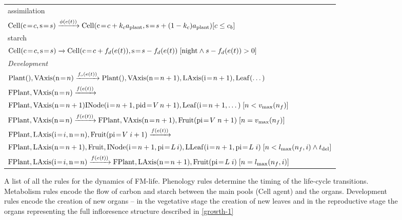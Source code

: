 \begin{figure}[p]
{\begin{tabularx}{1.3\textwidth}{l}
\textsf{assimilation} \\
\addlinespace[-0.1cm]
$\mathrm{Cell}(\ar{c}{c}, \ar{s}{s}) \xrightarrow{\phi(e(t))}
\mathrm{Cell}(\ar{c}{c+k_c a_{\mathrm{plant}}}, \ar{s}{s+(1-k_c) a_{\mathrm{plant}}})
[c \leq c_b]$ \\

\textsf{starch} \\
\addlinespace[-0.1cm]
$\mathrm{Cell}(\ar{c}{c}, \ar{s}{s}) \xrightarrow{}
\mathrm{Cell}(\ar{c}{c+f_d(e(t)}), \ar{s}{s-f_d(e(t)}) \;
[\mathrm{night} \land s-f_d(e(t)) > 0]$ \\ 

\textsf{\emph{Development}} \\
\addlinespace[-0.1cm]
$\mathrm{Plant}(), \mathrm{VAxis}(\mathrm{n} \! = \! {n}) \xrightarrow{f_o(e(t))}
\mathrm{Plant}(), \mathrm{VAxis}(\mathrm{n} \! = \! {n+1}), \mathrm{LAxis}(\mathrm{i} \! = \! {n+1}),
\mathrm{Leaf}(\dots)$ \\

$\mathrm{FPlant}, \mathrm{VAxis}(\mathrm{n} \! = \! {n}) \xrightarrow{f(e(t))}$ \\
\addlinespace[-0.27cm]
$\mathrm{FPlant}, \mathrm{VAxis}(\ar{n}{n+1})
\mathrm{INode}(\ar{i}{n+1}, \ar{pid}{V \, n+1}),
\mathrm{Leaf}(\ar{i}{n+1}, \dots)
\; [n < v_{\mathrm{max}}(n_f)]$ \\

$\mathrm{FPlant}, \mathrm{VAxis}(\mathrm{n} \! = \! {n}) \xrightarrow{f(e(t))}
\mathrm{FPlant}, \mathrm{VAxis}(\mathrm{n} \! = \! {n+1}), \mathrm{Fruit}(\mathrm{pi} \! = \! {V \; n+1})
\; [n = v_{\mathrm{max}}(n_f)]$ \\

$\mathrm{FPlant}, \mathrm{LAxis}(\mathrm{i} \! = \! {i},\mathrm{n} \! = \! {n}), \mathrm{Fruit}(\mathrm{pi} \! = \! {V \; i+1}) \xrightarrow{f(e(t))}$ \\
\addlinespace[-0.27cm]
$\mathrm{FPlant}, \mathrm{LAxis}(\ar{n}{n+1}), \mathrm{Fruit},
\mathrm{INode}(\ar{i}{n+1}, \ar{pi}{L \, i}), \mathrm{LLeaf}(\ar{i}{n+1}, \ar{pi}{L \; i})
\; [n < l_{\mathrm{max}}(n_f, i) \wedge t_{\mathrm{del}}]$ \\

$\mathrm{FPlant}, \mathrm{LAxis}(\ar{i}{i}, \ar{n}{n}) \xrightarrow{f(e(t))}
\mathrm{FPlant}, \mathrm{LAxis}(\ar{n}{n+1}), \mathrm{Fruit}(\ar{pi}{L \; i})
\; [n = l_{\mathrm{max}}(n_f, i)]$ \\

\bottomrule
\end{tabularx}} %
\caption{A list of all the rules for the dynamics of FM-life. Phenology rules
  determine the timing of the life-cycle transitions. Metabolism rules encode
  the flow of carbon and starch between the main pools ($\mathrm{Cell}$ agent)
  and the organs. Development rules encode the creation of new organs -- in the
  vegetative stage the creation of new leaves and in the reproductive stage the
  organs representing the full infloresence structure described in
  \ref{growth-1}}
\label{fig:fmComplete}
\end{figure}


